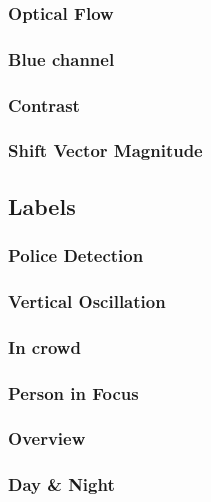 %
\subsubsection{Optical Flow}
%

%
\subsubsection{Blue channel}
%

%
\subsubsection{Contrast}
%

%
\subsubsection{Shift Vector Magnitude}
%

%
\subsection{Labels}
%

%
\subsubsection{Police Detection}
%

%
\subsubsection{Vertical Oscillation}
%

%
\subsubsection{In crowd}
%

%
\subsubsection{Person in Focus}
%

%
\subsubsection{Overview}
%

%
\subsubsection{Day \& Night}
%
